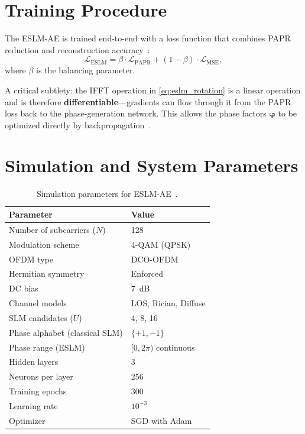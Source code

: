 \section{Training Procedure}
\label{sec:eslm_training}

The ESLM-AE is trained end-to-end with a loss function that combines
PAPR reduction and reconstruction accuracy~\cite{hao2019extended}:
\begin{equation}
    \mathcal{L}_{\mathrm{ESLM}}
    = \beta \cdot \mathcal{L}_{\mathrm{PAPR}}
    + (1 - \beta) \cdot \mathcal{L}_{\mathrm{MSE}},
    \label{eq:eslm_loss}
\end{equation}
where $\beta$ is the balancing parameter.

A critical subtlety: the IFFT operation in \eqref{eq:eslm_rotation} is
a linear operation and is therefore \textbf{differentiable}---gradients
can flow through it from the PAPR loss back to the phase-generation
network.  This allows the phase factors $\bm{\varphi}$ to be optimized
directly by backpropagation~\cite{hao2019extended}.


\section{Simulation and System Parameters}
\label{sec:eslm_params}

\begin{table}[H]
    \centering
    \caption{Simulation parameters for ESLM-AE~\cite{hao2019extended}.}
    \label{tab:eslm_params}
    \begin{tabular}{@{} l l @{}}
        \toprule
        \textbf{Parameter} & \textbf{Value} \\
        \midrule
        Number of subcarriers ($N$) & 128 \\
        Modulation scheme & 4-QAM (QPSK) \\
        OFDM type & DCO-OFDM \\
        Hermitian symmetry & Enforced \\
        DC bias & $7$~dB \\
        Channel models & LOS, Rician, Diffuse \\
        SLM candidates ($U$) & 4, 8, 16 \\
        Phase alphabet (classical SLM) & $\{+1, -1\}$ \\
        Phase range (ESLM) & $[0, 2\pi)$ continuous \\
        Hidden layers & 3 \\
        Neurons per layer & 256 \\
        Training epochs & 300 \\
        Learning rate & $10^{-3}$ \\
        Optimizer & SGD with Adam \\
        \bottomrule
    \end{tabular}
\end{table}


